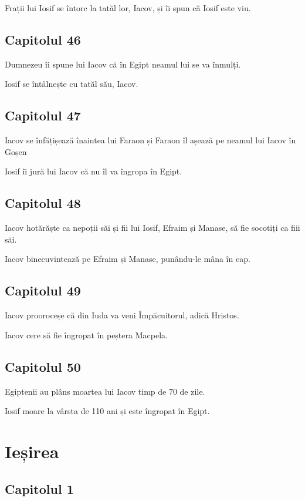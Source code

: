 \documentclass[12pt,a4paper]{article}
\begin{document}
Frații lui Iosif se întorc la tatăl lor, Iacov, și îi spun că Iosif este viu.

\subsection{Capitolul 46}

Dumnezeu îi spune lui Iacov că în Egipt neamul lui se va înmulți.

Iosif se întâlnește cu tatăl său, Iacov.

\subsection{Capitolul 47}

Iacov se înfățișează înaintea lui Faraon și Faraon îl așează pe neamul lui Iacov în Goșen

Iosif îi jură lui Iacov că nu îl va îngropa în Egipt.

\subsection{Capitolul 48}

Iacov hotărăște ca nepoții săi și fii lui Iosif, Efraim și Manase, să fie socotiți ca fiii săi.

Iacov binecuvintează pe Efraim și Manase, punându-le mâna în cap.

\subsection{Capitolul 49}

Iacov prooroceșe că din Iuda va veni Împăcuitorul, adică Hristos.

Iacov cere să fie îngropat în peștera Macpela.

\subsection{Capitolul 50}

Egiptenii au plâns moartea lui Iacov timp de 70 de zile.

Iosif moare la vârsta de 110 ani și este îngropat în Egipt.

\section{Ieșirea}

\subsection{Capitolul 1}
\end{document}
